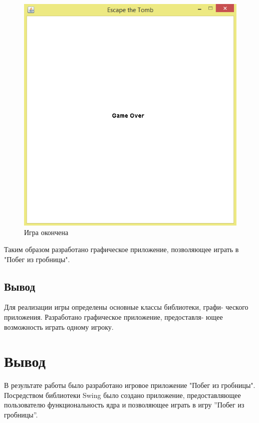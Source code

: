 \begin{figure}[H]
	\begin{center}
		\includegraphics[scale=0.7]{image/gameover.png}
		\caption{Игра окончена} 
		\label{pic:pic_name} %
	\end{center}
\end{figure}

Таким образом разработано графическое приложение, позволяющее играть в "Побег из гробницы".\\

\subsection{Вывод}

Для реализации игры определены основные классы библиотеки, графи-
ческого приложения. Разработано графическое приложение, предоставля-
ющее возможность играть одному игроку.\\



\section{Вывод}

В результате работы было разработано игровое приложение "Побег из гробницы". Посредством библиотеки Swing было создано приложение, предоставляющее пользователю функциональность
ядра и позволяющее играть в игру ”Побег из гробницы”.



